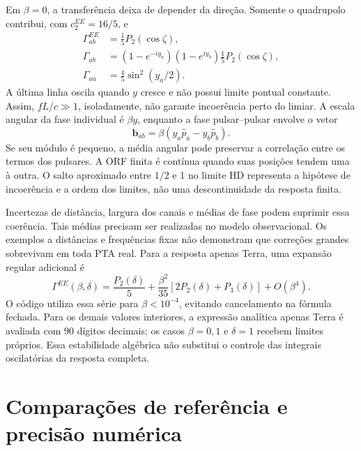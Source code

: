 Em \(\beta=0\), a transferência deixa de depender da direção.
Somente o quadrupolo contribui, com \(c_2^{EE}=16/5\), e
\begin{equation}
 \begin{aligned}
 \Gamma_{ab}^{EE}&=\frac15P_2(\cos\zeta),\\
 \Gamma_{ab}&=(1-e^{-iy_a})(1-e^{iy_b})
                         \frac15P_2(\cos\zeta),\\
 \Gamma_{aa}&=\frac45\sin^2(y_a/2).
 \end{aligned}
 \label{eq:pta-limiar}
\end{equation}
A última linha oscila quando \(y\) cresce e não possui limite
pontual constante. Assim, \(fL/c\gg1\), isoladamente, não garante
incoerência perto do limiar. A escala angular da fase individual é
\(\beta y\), enquanto a fase pulsar--pulsar envolve o vetor
\begin{equation}
 \mathbf b_{ab}=\beta(y_a\hat p_a-y_b\hat p_b).
 \label{eq:pta-coerencia-par}
\end{equation}
Se seu módulo é pequeno, a média angular pode preservar a correlação
entre os termos dos pulsares. A ORF finita é contínua quando suas
posições tendem uma à outra. O salto aproximado entre \(1/2\) e
1 no limite HD representa a hipótese de incoerência e a ordem dos
limites, não uma descontinuidade da resposta finita.

Incertezas de distância, largura dos canais e médias de fase podem
suprimir essa coerência. Tais médias precisam ser realizadas no
modelo observacional. Os exemplos a distâncias e frequências fixas
não demonstram que correções grandes sobrevivam em toda PTA real.
Para a resposta apenas Terra, uma expansão regular adicional é
\begin{equation}
 \Gamma^{EE}(\beta,\delta)
 =\frac{P_2(\delta)}5+
   \frac{\beta^2}{35}[2P_2(\delta)+P_3(\delta)]+O(\beta^4).
 \label{eq:pta-expansao-limiar}
\end{equation}
O código utiliza essa série para \(\beta<10^{-4}\), evitando
cancelamento na fórmula fechada. Para os demais valores interiores,
a expressão analítica apenas Terra é avaliada com 90 dígitos
decimais; os casos \(\beta=0,1\) e \(\delta=1\) recebem
limites próprios. Essa estabilidade algébrica não substitui o
controle das integrais oscilatórias da resposta completa.

\section{Comparações de referência e precisão numérica}

